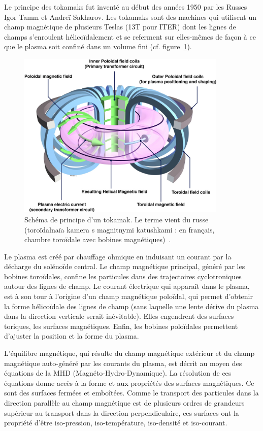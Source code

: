 \begin{refsection}
Le principe des tokamaks fut inventé au début des années 1950 par les Russes Igor Tamm et
Andreï Sakharov. Les tokamaks sont des machines qui utilisent
un champ magnétique de plusieurs Teslas (13T pour ITER) dont les lignes de
champs s'enroulent hélicoïdalement et se referment sur elles-mêmes de façon à ce que le plasma soit
confiné dans un volume fini (cf. figure~\ref{tokamak}).
\begin{figure}[!htbp]
    \centering
	\includegraphics[height=80mm]{figures/1-tokamak.jpg}
	\caption{Schéma de principe d'un tokamak. Le terme vient du
russe (toroïdalnaïa kamera s magnitnymi katushkami : en français, chambre toroïdale avec bobines
magnétiques)~\parencite{efda}.}\label{tokamak}
\end{figure}

Le plasma  est créé par chauffage ohmique en induisant un courant
par la décharge du solénoïde central. Le champ magnétique principal, généré
par les bobines toroïdales, confine les particules dans des trajectoires
cyclotroniques autour des lignes de champ. Le courant électrique qui apparaît
dans le plasma, est à son tour à l'origine d'un champ magnétique poloïdal, qui
permet d'obtenir la forme hélicoïdale des lignes de champ (sans laquelle
une lente dérive du plasma dans la direction verticale serait inévitable). Elles
engendrent des surfaces toriques, les surfaces magnétiques.
Enfin, les bobines poloïdales permettent d'ajuster la position et la forme du
plasma.

L'équilibre magnétique, qui résulte du champ magnétique extérieur et du champ
magnétique auto-généré par les courants du plasma, est décrit au moyen des
équations de la MHD (Magnéto-Hydro-Dynamique).
La résolution de ces équations donne accès à la forme et aux propriétés des
surfaces magnétiques. Ce sont des surfaces fermées et emboîtées. Comme le
transport des particules dans la direction parallèle au champ magnétique est de
plusieurs ordres de grandeurs supérieur au transport dans la direction
perpendiculaire, ces surfaces ont la propriété d'être iso-pression,
iso-température, iso-densité et iso-courant.


\end{refsection}
